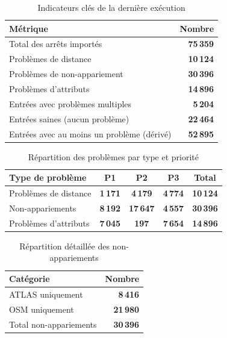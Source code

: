 \begin{table}[H]
\centering
\caption{Indicateurs clés de la dernière exécution}
\label{tab:chap6_execution_counters}
\small
\begin{tabular}{l r}
\toprule
Métrique & Nombre \\
\midrule
Total des arrêts importés & \textbf{75\,359} \\
Problèmes de distance & \textbf{10\,124} \\
Problèmes de non-appariement & \textbf{30\,396} \\
Problèmes d'attributs & \textbf{14\,896} \\
Entrées avec problèmes multiples & \textbf{5\,204} \\
Entrées saines (aucun problème) & \textbf{22\,464} \\
\midrule
Entrées avec au moins un problème (dérivé) & \textbf{52\,895} \\
\bottomrule
\end{tabular}
\end{table}

\begin{table}[H]
\centering
\caption{Répartition des problèmes par type et priorité}
\label{tab:chap6_problems_by_priority}
\small
\begin{tabular}{l c c c c}
\toprule
Type de problème & P1 & P2 & P3 & Total \\
\midrule
Problèmes de distance & \textbf{1\,171} & \textbf{4\,179} & \textbf{4\,774} & \textbf{10\,124} \\
Non-appariements & \textbf{8\,192} & \textbf{17\,647} & \textbf{4\,557} & \textbf{30\,396} \\
Problèmes d'attributs & \textbf{7\,045} & \textbf{197} & \textbf{7\,654} & \textbf{14\,896} \\
\bottomrule
\end{tabular}
\end{table}

\begin{table}[H]
\centering
\caption{Répartition détaillée des non-appariements}
\label{tab:chap6_unmatched_breakdown}
\small
\begin{tabular}{l r}
\toprule
Catégorie & Nombre \\
\midrule
ATLAS uniquement & \textbf{8\,416} \\
OSM uniquement & \textbf{21\,980} \\
\midrule
Total non-appariements & \textbf{30\,396} \\
\bottomrule
\end{tabular}
\end{table}



